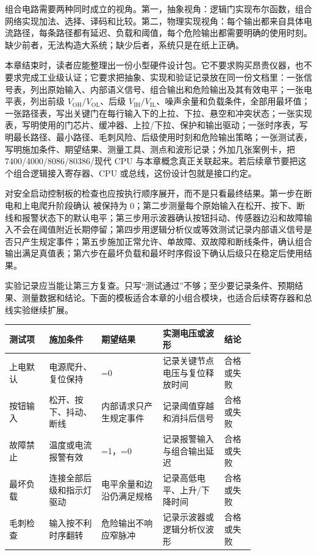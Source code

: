 组合电路需要两种同时成立的视角。第一，抽象视角：逻辑门实现布尔函数，组合网络实现加法、选择、译码和比较。第二，物理实现视角：每个输出都来自具体电流路径，每条路径都有延迟、负载和阈值，每个危险输出都需要明确的使用时刻。缺少前者，无法构造大系统；缺少后者，系统只是在纸上正确。

本章结束时，读者应能整理出一份小型硬件设计包。它不要求购买昂贵仪器，也不要求完成工业级认证；它要求把抽象、实现和验证记录放在同一份文档里：一张信号表，列出原始输入、内部语义信号、组合输出和危险输出及其有效电平；一张电平表，列出前级 $V_\mathrm{OH}/V_\mathrm{OL}$、后级 $V_\mathrm{IH}/V_\mathrm{IL}$、噪声余量和负载条件，全部用最坏值；一张路径表，写出关键门在每行输入下的上拉、下拉、悬空和冲突状态；一张实现表，写明使用的门芯片、缓冲器、上拉/下拉、保护和输出驱动；一张时序表，写明最长路径、最小路径、毛刺风险、后级使用时刻和危险输出策略；一张测试表，写明施加条件、期望结果、测量工具、测点和波形记录；外加几张案例卡，把 7400/4000/8086/80386/现代 CPU 与本章概念真正关联起来。若后续章节要把这个组合逻辑接入寄存器、CPU 或总线，这份设计包就是接口约定。

对安全启动控制板的检查也应按执行顺序展开，而不是只看最终结果。第一步在断电和上电爬升阶段确认  被保持为 0；第二步测量每个原始输入在松开、按下、断线和报警状态下的默认电平；第三步用示波器确认按钮抖动、传感器边沿和故障输入不会在阈值附近长期停留；第四步用逻辑分析仪或等效测试记录内部语义信号是否只产生规定事件；第五步施加正常允许、单故障、双故障和断线条件，确认组合输出满足真值表；第六步在最坏负载和最坏时序假设下确认后级只在稳定后使用结果。

实验记录应当能让第三方复查。只写“测试通过”不够；至少要记录条件、预期结果、测量数据和结论。下面的模板适合本章的小组合模块，也适合后续寄存器和总线实验继续扩展。

\begin{longtable}{L{0.13\linewidth}L{0.17\linewidth}L{0.2\linewidth}L{0.2\linewidth}L{0.1\linewidth}}
\toprule
测试项 & 施加条件 & 期望结果 & 实测电压或波形 & 结论 \\
\midrule
上电默认 & 电源爬升、复位保持 & =0 & 记录关键节点电压与复位释放时间 & 合格或失败 \\
按钮输入 & 松开、按下、抖动、断线 & 内部请求只产生规定事件 & 记录阈值穿越和消抖后信号 & 合格或失败 \\
故障禁止 & 温度或电流报警有效 & =1，=0 & 记录报警输入与组合输出延迟 & 合格或失败 \\
最坏负载 & 连接全部后级和指示灯驱动 & 电平余量和边沿仍满足规格 & 记录高低电平、上升/下降时间 & 合格或失败 \\
毛刺检查 & 输入按不利时序翻转 & 危险输出不响应窄脉冲 & 记录示波器或逻辑分析仪波形 & 合格或失败 \\
\bottomrule
\end{longtable}

